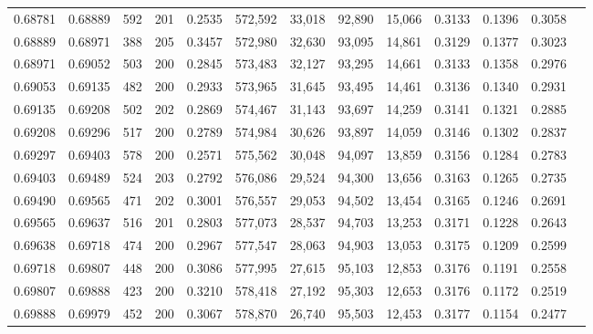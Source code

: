 \begin{tabular}{rrrrrrrrrrrrr}
0.68781 & 0.68889 &   592 & 201 &                                     0.2535 & 572,592 &  33,018 &  92,890 &  15,066 & 0.3133 & 0.1396 & 0.3058 \\
0.68889 & 0.68971 &   388 & 205 &                                     0.3457 & 572,980 &  32,630 &  93,095 &  14,861 & 0.3129 & 0.1377 & 0.3023 \\
0.68971 & 0.69052 &   503 & 200 &                                     0.2845 & 573,483 &  32,127 &  93,295 &  14,661 & 0.3133 & 0.1358 & 0.2976 \\
0.69053 & 0.69135 &   482 & 200 &                                     0.2933 & 573,965 &  31,645 &  93,495 &  14,461 & 0.3136 & 0.1340 & 0.2931 \\
0.69135 & 0.69208 &   502 & 202 &                                     0.2869 & 574,467 &  31,143 &  93,697 &  14,259 & 0.3141 & 0.1321 & 0.2885 \\
0.69208 & 0.69296 &   517 & 200 &                                     0.2789 & 574,984 &  30,626 &  93,897 &  14,059 & 0.3146 & 0.1302 & 0.2837 \\
0.69297 & 0.69403 &   578 & 200 &                                     0.2571 & 575,562 &  30,048 &  94,097 &  13,859 & 0.3156 & 0.1284 & 0.2783 \\
0.69403 & 0.69489 &   524 & 203 &                                     0.2792 & 576,086 &  29,524 &  94,300 &  13,656 & 0.3163 & 0.1265 & 0.2735 \\
0.69490 & 0.69565 &   471 & 202 &                                     0.3001 & 576,557 &  29,053 &  94,502 &  13,454 & 0.3165 & 0.1246 & 0.2691 \\
0.69565 & 0.69637 &   516 & 201 &                                     0.2803 & 577,073 &  28,537 &  94,703 &  13,253 & 0.3171 & 0.1228 & 0.2643 \\
0.69638 & 0.69718 &   474 & 200 &                                     0.2967 & 577,547 &  28,063 &  94,903 &  13,053 & 0.3175 & 0.1209 & 0.2599 \\
0.69718 & 0.69807 &   448 & 200 &                                     0.3086 & 577,995 &  27,615 &  95,103 &  12,853 & 0.3176 & 0.1191 & 0.2558 \\
0.69807 & 0.69888 &   423 & 200 &                                     0.3210 & 578,418 &  27,192 &  95,303 &  12,653 & 0.3176 & 0.1172 & 0.2519 \\
0.69888 & 0.69979 &   452 & 200 &                                     0.3067 & 578,870 &  26,740 &  95,503 &  12,453 & 0.3177 & 0.1154 & 0.2477 \\

\end{tabular}
